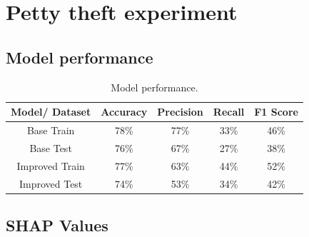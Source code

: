 \documentclass[twoside,11pt]{article}
\begin{document}
\section{Petty theft experiment}

\subsection{Model performance}

\begin{table}[!htb]
\centering
\begin{tabular}{|c|c|c|c|c|}
\hline

\textbf{Model/ Dataset} & \textbf{Accuracy} & \textbf{Precision} & \textbf{Recall} & \textbf{F1 Score} \\ \hline
     Base Train &     78\% &     77\% &   33\% &     46\% \\
      Base Test &     76\% &     67\% &   27\% &     38\% \\
Improved Train &     77\% &      63\% &   44\% &     52\% \\
 Improved Test &     74\% &      53\% &   34\% &     42\% \\

\hline
\end{tabular}
\caption{Model performance.}
\end{table}



\subsection{SHAP Values}
\end{document}
